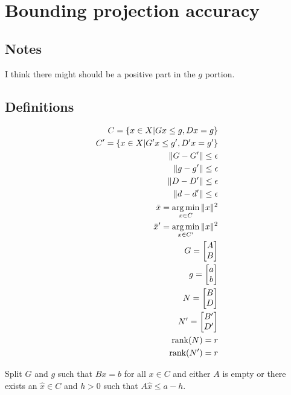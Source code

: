 
\color{black}

\section{Bounding projection accuracy}
\subsection{Notes}

I think there might should be a positive part in the $g$ portion.

\subsection{Definitions}

\begin{align*}
C = \{ x \in X | Gx\le g, Dx = g \} \\
C' = \{ x \in X | G'x\le g', D'x = g' \} \\
\|G - G'\| \le \epsilon \\
\|g - g'\| \le \epsilon \\
\|D - D'\| \le \epsilon \\
\|d - d'\| \le \epsilon \\
{{\bar x}} = \operatorname*{arg\,min}_{x\in C}\|x\|^2 \\
{{\bar x}}' = \operatorname*{arg\,min}_{x\in C'}\|x\|^2 \\
G = \begin{bmatrix}A \\ B\end{bmatrix} \\
g = \begin{bmatrix}a \\ b\end{bmatrix} \\
N = \begin{bmatrix}B \\ D\end{bmatrix}\\
N' = \begin{bmatrix}B' \\ D'\end{bmatrix}\\
\text{rank}(N) = r \\
\text{rank}(N') = r \\
\end{align*}

Split $G$ and $g$ such that
$Bx = b$ for all $x \in C$ and either $A$ is empty or there exists an $\hat x \in C$ and $h > 0$ such that $A\hat x \le a - h$.

